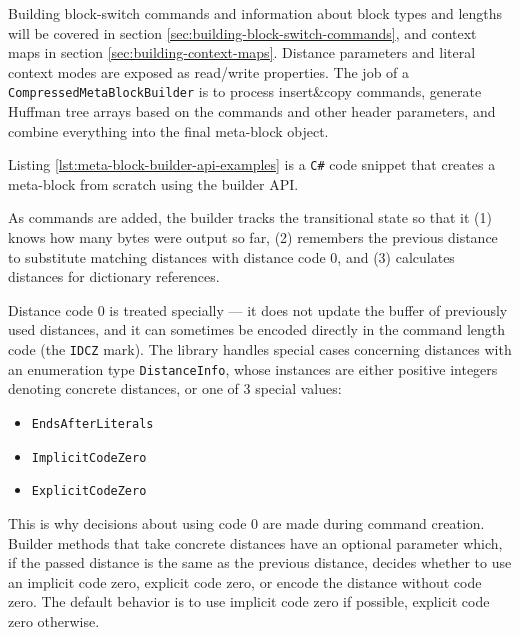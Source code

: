 \documentclass[english,master,dept460,male,cpp,cpdeclaration]{diploma}
\newcommand{\nosep}{\itemsep0em}
\begin{document}
		\noindent
		Building block-switch commands and information about block types and lengths will be covered in section \ref{sec:building-block-switch-commands}, and context maps in section \ref{sec:building-context-maps}. Distance parameters and literal context modes are exposed as read/write properties. The job of a \verb|CompressedMetaBlockBuilder| is to process insert\&copy commands, generate Huffman tree arrays based on the commands and other header parameters, and combine everything into the final meta-block object.
		
		Listing \ref{lst:meta-block-builder-api-examples} is a \verb|C#| code snippet that creates a meta-block from scratch using the builder API.
		
		
		
		\noindent
		As commands are added, the builder tracks the transitional state so that it (1) knows how many bytes were output so far, (2) remembers the previous distance to substitute matching distances with distance code 0, and (3) calculates distances for dictionary references.
		
		Distance code 0 is treated specially --- it does not update the buffer of previously used distances, and it can sometimes be encoded directly in the command length code (the \verb|IDCZ| mark). The library handles special cases concerning distances with an enumeration type \verb|DistanceInfo|, whose instances are either positive integers denoting concrete distances, or one of 3 special values:
		
		\begin{itemize} \nosep
			\item \verb|EndsAfterLiterals|
			\item \verb|ImplicitCodeZero|
			\item \verb|ExplicitCodeZero|
		\end{itemize}
		
		\noindent
		This is why decisions about using code 0 are made during command creation. Builder methods that take concrete distances have an optional parameter which, if the passed distance is the same as the previous distance, decides whether to use an implicit code zero, explicit code zero, or encode the distance without code zero. The default behavior is to use implicit code zero if possible, explicit code zero otherwise.
		
\end{document}
